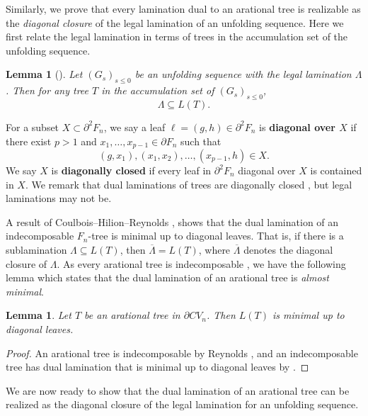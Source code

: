 \documentclass[11pt, letterpaper]{amsart}
\theoremstyle{plain}
\newtheorem{lemma}[theorem]{Lemma}
\theoremstyle{definition}
\begin{document}
Similarly, we prove that every lamination dual to an arational tree is
realizable as the \emph{diagonal closure} of the legal lamination of an unfolding sequence.
Here we first relate the legal lamination in terms of trees in the
accumulation set of the unfolding sequence.

\begin{lemma}[{\cite[Page 5]{NPR2014}}]\label{lem:arational_legal_lamination}
  Let $(G_s)_{s \le 0}$ be an unfolding sequence with the legal lamination
  $\Lambda$. Then for any tree $T$ in the accumulation set of $(G_s)_{s \le 0}$,
  \[
    \Lambda \subseteq L(T).
  \]
\end{lemma}

For a subset $X \subset \partial^2F_n$, we say a leaf $\ell=(g,h) \in \partial^2F_n$ is
\textbf{diagonal over $X$} if there exist $p>1$ and $x_1,\ldots, x_{p-1} \in
\partial F_n$ such that
\[
  (g, x_1), (x_1, x_2), \ldots, (x_{p-1},h) \in X.
\]
We say $X$ is \textbf{diagonally closed} if every leaf in
$\partial^2F_n$ diagonal over $X$ is contained in $X$. We remark that dual
laminations of trees are diagonally closed \cite[Page 751]{CHL2008RtreeII}, but
legal laminations may not be.


A result of Coulbois--Hilion--Reynolds \cite[Theorem A]{CHR2015indecomposable},
shows that the dual lamination of an indecomposable $F_n$-tree is minimal up to
diagonal leaves. That is, if there is a sublamination $\Lambda \subseteq L(T)$,
then $\overline{\Lambda} = L(T)$, where $\overline{\Lambda}$ denotes the
diagonal closure of $\Lambda$. As every arational tree is indecomposable
\cite[Theorem 1.1]{reynolds2012reducing}, we have the following lemma which
states that the dual lamination of an arational tree is \emph{almost
  minimal}.

\begin{lemma}\label{lem:arational_minimal}
  Let $T$ be an arational tree in $\partial CV_n$. Then $L(T)$ is minimal up to
  diagonal leaves.
\end{lemma}
\begin{proof}
  An arational tree is indecomposable by Reynolds \cite[Theorem
  1.1]{reynolds2012reducing}, and an indecomposable tree has dual lamination that
  is minimal up to diagonal leaves by \cite[Theorem A]{CHR2015indecomposable}.
\end{proof}

We are now ready to show that the dual lamination of an arational tree can be realized as the diagonal closure of the legal lamination for an unfolding sequence.
\end{document}
